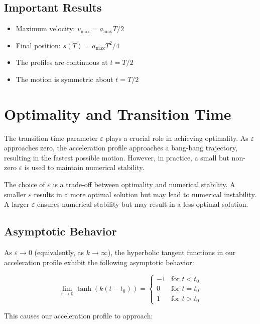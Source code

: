 \documentclass[12pt,a4paper]{article}
\begin{document}
\subsection{Important Results}
\begin{itemize}
\item Maximum velocity: $v_{\text{max}} = a_{\text{max}}T/2$
\item Final position: $s(T) = a_{\text{max}}T^2/4$
\item The profiles are continuous at $t = T/2$
\item The motion is symmetric about $t = T/2$
\end{itemize}

\section{Optimality and Transition Time}

The transition time parameter $\varepsilon$ plays a crucial role in achieving optimality. As $\varepsilon$ approaches zero, the acceleration profile approaches a bang-bang trajectory, resulting in the fastest possible motion. However, in practice, a small but non-zero $\varepsilon$ is used to maintain numerical stability.

The choice of $\varepsilon$ is a trade-off between optimality and numerical stability. A smaller $\varepsilon$ results in a more optimal solution but may lead to numerical instability. A larger $\varepsilon$ ensures numerical stability but may result in a less optimal solution.

\subsection{Asymptotic Behavior}

As $\varepsilon \to 0$ (equivalently, as $k \to \infty$), the hyperbolic tangent functions in our acceleration profile exhibit the following asymptotic behavior:

\begin{equation}
\lim_{\varepsilon \to 0} \tanh(k(t-t_0)) = \begin{cases}
-1 & \text{for } t < t_0 \\
0 & \text{for } t = t_0 \\
1 & \text{for } t > t_0
\end{cases}
\end{equation}

This causes our acceleration profile to approach:
\end{document}
